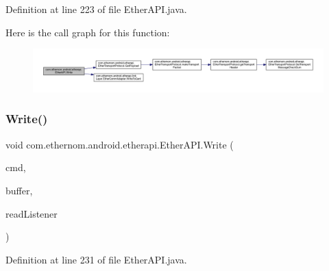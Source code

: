 Definition at line 223 of file Ether\+A\+P\+I.\+java.

Here is the call graph for this function\+:\nopagebreak
\begin{figure}[H]
\begin{center}
\leavevmode
\includegraphics[width=350pt]{classcom_1_1ethernom_1_1android_1_1etherapi_1_1_ether_a_p_i_aa812a2cc15c8b51c541b128b773c864f_cgraph}
\end{center}
\end{figure}
\mbox{\label{classcom_1_1ethernom_1_1android_1_1etherapi_1_1_ether_a_p_i_a404cbb6c5364773e3c97e86192e1762d}} 
\subsubsection{\texorpdfstring{Write()}{Write()}\hspace{0.1cm}{\footnotesize\ttfamily [3/6]}}
{\footnotesize\ttfamily void com.\+ethernom.\+android.\+etherapi.\+Ether\+A\+P\+I.\+Write (\begin{DoxyParamCaption}\item[{byte}]{cmd,  }\item[{byte \mbox{[}$\,$\mbox{]}}]{buffer,  }\item[{final \mbox{\hyperlink{interfacecom_1_1ethernom_1_1android_1_1etherapi_1_1_read_listener}{Read\+Listener}}}]{read\+Listener }\end{DoxyParamCaption})}



Definition at line 231 of file Ether\+A\+P\+I.\+java.

